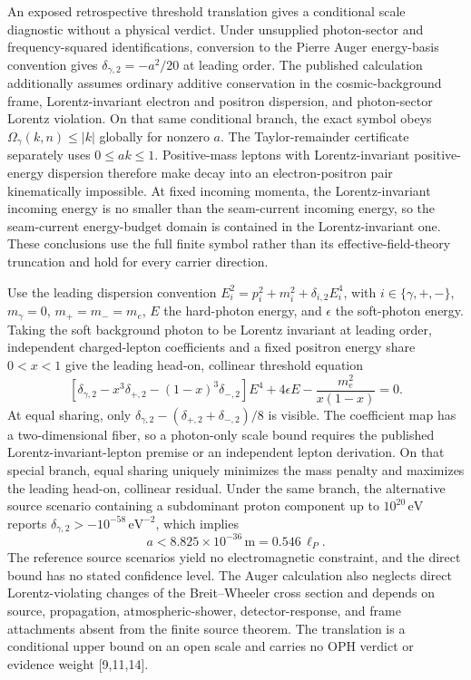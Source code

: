 \documentclass[10pt]{article}
\begin{document}
An exposed retrospective threshold translation gives a conditional scale
diagnostic without a physical verdict. Under unsupplied photon-sector and
frequency-squared identifications, conversion to the Pierre Auger energy-basis
convention gives \(\delta_{\gamma,2}=-a^2/20\) at leading order. The published
calculation additionally assumes ordinary additive conservation in the
cosmic-background frame, Lorentz-invariant electron and positron dispersion,
and photon-sector Lorentz violation. On that same conditional branch, the
exact symbol obeys \(\Omega_\gamma(k,n)\leq |k|\) globally for nonzero \(a\).
The Taylor-remainder certificate separately uses \(0\leq ak\leq1\).
Positive-mass leptons with Lorentz-invariant positive-energy dispersion
therefore make decay into an electron-positron pair kinematically impossible.
At fixed incoming momenta,
the Lorentz-invariant incoming energy is no smaller than the seam-current
incoming energy, so the seam-current
energy-budget domain is contained in the Lorentz-invariant one. These
conclusions use the full finite symbol rather than its
effective-field-theory truncation and hold for every carrier direction.

Use the leading dispersion convention
\(E_i^2=p_i^2+m_i^2+\delta_{i,2}E_i^4\), with
\(i\in\{\gamma,+,-\}\), \(m_\gamma=0\), \(m_+=m_-=m_e\), \(E\) the
hard-photon energy, and \(\epsilon\) the soft-photon energy. Taking the soft background photon to
be Lorentz invariant at leading order, independent charged-lepton
coefficients and a fixed positron energy share \(0<x<1\) give the leading
head-on, collinear threshold equation
\[
 \left[\delta_{\gamma,2}-x^3\delta_{+,2}
 -(1-x)^3\delta_{-,2}\right]E^4
 +4\epsilon E-\frac{m_e^2}{x(1-x)}=0.
\]
At equal sharing, only
\(\delta_{\gamma,2}-(\delta_{+,2}+\delta_{-,2})/8\) is visible. The
coefficient map has a two-dimensional fiber, so a photon-only scale bound
requires the published Lorentz-invariant-lepton premise or an independent
lepton derivation. On that special branch, equal sharing uniquely minimizes
the mass penalty and maximizes the leading head-on, collinear residual. Under
the same branch, the
alternative source scenario containing a
subdominant proton component up to \(10^{20}\,\mathrm{eV}\) reports
\(\delta_{\gamma,2}>-10^{-58}\,\mathrm{eV}^{-2}\), which implies
\[
 a<8.825\times10^{-36}\,\mathrm m=0.546\,\ell_P.
\]
The reference source scenarios yield no electromagnetic constraint, and the
direct bound has no stated confidence level. The Auger calculation also
neglects direct Lorentz-violating changes of the Breit--Wheeler cross section
and depends on source, propagation, atmospheric-shower, detector-response,
and frame attachments absent from the finite source theorem. The translation
is a conditional upper bound on an open scale and carries no OPH verdict or
evidence weight [9,11,14].
\end{document}

